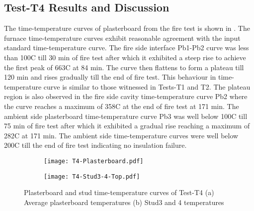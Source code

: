 \subsection{Test-T4 Results and Discussion}

The time-temperature curves of plasterboard from the fire test is shown in . The furnace time-temperature curves exhibit reasonable agreement with the input standard time-temperature curve. The fire side interface Pb1-Pb2 curve was less than 100\degree C till 30 min of fire test after which it exhibited a steep rise to achieve the first peak of 663\degree C at 84 min. The curve then flattens to form a plateau till 120 min and rises gradually till the end of fire test. This behaviour in time-temperature curve is similar to those witnessed in Tests-T1 and T2. The plateau region is also observed in the fire side cavity time-temperature curve Pb2 where the curve reaches a maximum of 358\degree C at the end of fire test at 171 min. The ambient side plasterboard time-temperature curve Pb3 was well below 100\degree C till 75 min of fire test after which it exhibited a gradual rise reaching a maximum of  282\degree C at 171 min. The ambient side time-temperature curves were well below 200\degree C till the end of fire test indicating no insulation failure.
\begin{figure}[!htbp]
	\centering
	\begin{subfigure}[b]{0.7\textwidth}
		\centering
		\texttt{[image: T4-Plasterboard.pdf]}
		\caption{}
		\label{subfig:T4-Plasterboard}
	\end{subfigure}
	\begin{subfigure}[b]{0.7\textwidth}
		\centering
		\texttt{[image: T4-Stud3-4-Top.pdf]}
		\caption{}
		\label{subfig:T4-Stud3-4-Top}
	\end{subfigure}
	   \caption{Plasterboard and stud time-temperature curves of Test-T4 (a) Average plasterboard temperatures (b) Stud3 and 4 temperatures}
	   \label{fig:T4-PB-Stud}
\end{figure}

